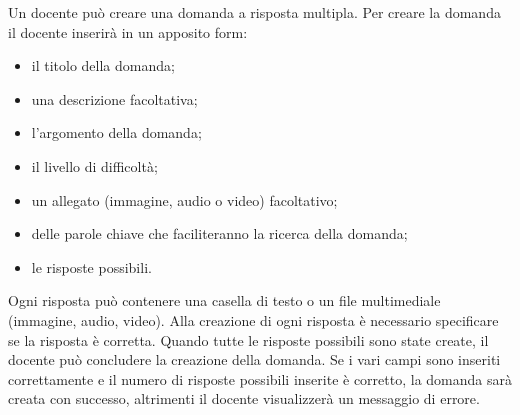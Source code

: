\documentclass[a4paper, titlepage]{article}
\begin{document}
Un docente può creare una domanda a risposta multipla. Per creare la domanda il docente inserirà in un apposito form:
\begin{itemize}
	\item il titolo della domanda;
	\item una descrizione facoltativa;
	\item l'argomento della domanda;
	\item il livello di difficoltà;
	\item un allegato (immagine, audio o video) facoltativo; 
	\item delle parole chiave che faciliteranno la ricerca della domanda;
	\item le risposte possibili. 
\end{itemize}
Ogni risposta può contenere una casella di testo o un file multimediale (immagine, audio, video). Alla creazione di ogni risposta è necessario specificare se la risposta è corretta. Quando tutte le risposte possibili sono state create, il docente può concludere la creazione della domanda.
Se i vari campi sono inseriti correttamente e il numero di risposte possibili inserite è corretto, la domanda sarà creata con successo, altrimenti il docente visualizzerà un messaggio di errore.
\end{document}
